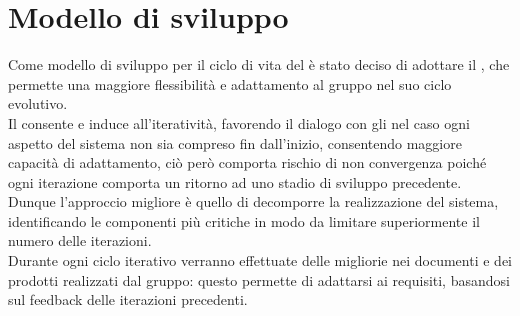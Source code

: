 \section{Modello di sviluppo}
\label{sec:modello_sviluppo}
Come modello di sviluppo per il ciclo di vita del  è stato deciso di adottare il \emph{}, che permette una maggiore flessibilità e adattamento al gruppo nel suo ciclo evolutivo.\\
Il  consente e induce all'iteratività, favorendo il dialogo con gli  nel caso ogni aspetto del sistema non sia compreso fin dall'inizio, consentendo maggiore capacità di adattamento, ciò però comporta rischio di non convergenza poiché ogni iterazione comporta un ritorno ad uno stadio di sviluppo precedente.
Dunque l'approccio migliore è quello di decomporre la realizzazione del sistema, identificando le componenti più critiche in modo da limitare superiormente il numero delle iterazioni.\\
Durante ogni ciclo iterativo verranno effettuate delle migliorie nei documenti e dei prodotti realizzati dal gruppo: questo permette di adattarsi ai requisiti, basandosi sul feedback delle iterazioni precedenti.
